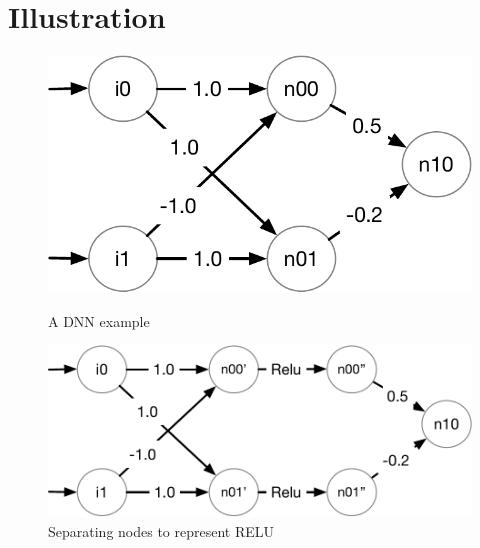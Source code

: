 \documentclass[oneside,11pt,dvipsnames]{book}
\numberwithin{equation}{section}
\theoremstyle{definition}
\theoremstyle{remark}
\begin{document}
\section{Illustration}

\begin{figure}[h]
    \centering
    \begin{minipage}{0.49\linewidth}
        \centering
        \includegraphics[width=0.6\linewidth]{reluplexA.pdf}
        \caption{A DNN example}\label{fig:reluplex}
    \end{minipage}
    \hfill
    \begin{minipage}{0.50\linewidth}
        \centering
        \includegraphics[width=0.9\linewidth]{reluplexB.pdf}
        \caption{Separating nodes to represent RELU}\label{fig:reluplexB}
    \end{minipage}
  \end{figure}

\end{document}
